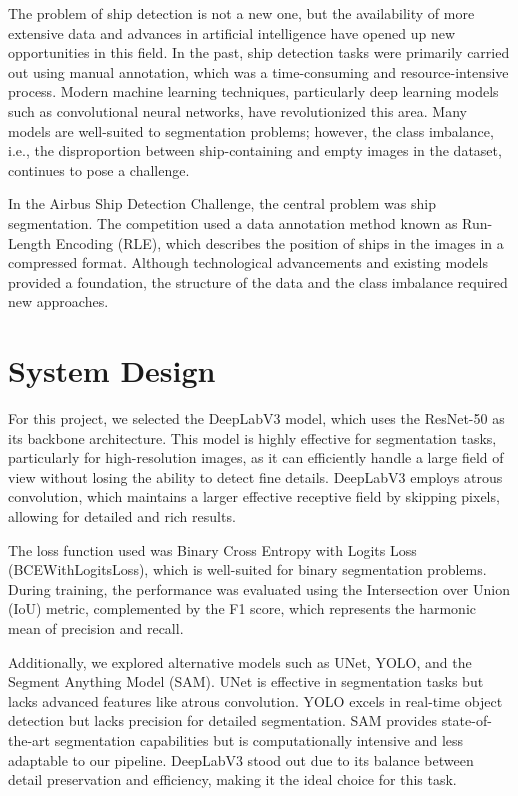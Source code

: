 \documentclass{article}
\begin{document}
The problem of ship detection is not a new one, but the availability of more extensive data and advances in artificial intelligence have opened up new opportunities in this field. In the past, ship detection tasks were primarily carried out using manual annotation, which was a time-consuming and resource-intensive process. Modern machine learning techniques, particularly deep learning models such as convolutional neural networks, have revolutionized this area. Many models are well-suited to segmentation problems; however, the class imbalance, i.e., the disproportion between ship-containing and empty images in the dataset, continues to pose a challenge.

In the Airbus Ship Detection Challenge, the central problem was ship segmentation. The competition used a data annotation method known as Run-Length Encoding (RLE), which describes the position of ships in the images in a compressed format. Although technological advancements and existing models provided a foundation, the structure of the data and the class imbalance required new approaches.

\section{System Design}

For this project, we selected the DeepLabV3 model, which uses the ResNet-50 as its backbone architecture. This model is highly effective for segmentation tasks, particularly for high-resolution images, as it can efficiently handle a large field of view without losing the ability to detect fine details. DeepLabV3 employs atrous convolution, which maintains a larger effective receptive field by skipping pixels, allowing for detailed and rich results.

The loss function used was Binary Cross Entropy with Logits Loss (BCEWithLogitsLoss), which is well-suited for binary segmentation problems. During training, the performance was evaluated using the Intersection over Union (IoU) metric, complemented by the F1 score, which represents the harmonic mean of precision and recall.

Additionally, we explored alternative models such as UNet, YOLO, and the Segment Anything Model (SAM). UNet is effective in segmentation tasks but lacks advanced features like atrous convolution. YOLO excels in real-time object detection but lacks precision for detailed segmentation. SAM provides state-of-the-art segmentation capabilities but is computationally intensive and less adaptable to our pipeline. DeepLabV3 stood out due to its balance between detail preservation and efficiency, making it the ideal choice for this task.
\end{document}
